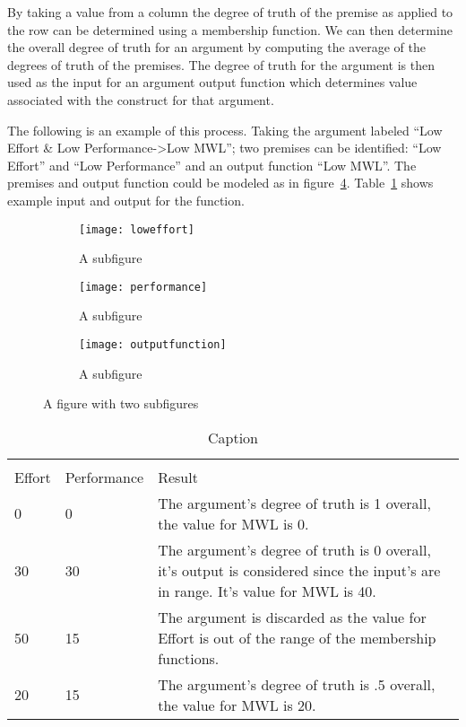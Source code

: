By taking a value from a column the degree of truth of the premise as applied to the row can be determined using a membership function. We can then determine the overall degree of truth for an argument by computing the average of the degrees of truth of the premises. The degree of truth for the argument is then used as the input for an argument output function which determines value associated with the construct for that argument.

The following is an example of this process. Taking the argument labeled ``Low Effort \& Low Performance->Low MWL''; two premises can be identified: ``Low Effort'' and ``Low Performance'' and an output function ``Low MWL''. The premises and output function could be modeled as in figure~\ref{fig:membership_functions}. Table~\ref{tab:memfunc_ex} shows example input and output for the function. 

\begin{figure}
\centering
\begin{subfigure}{.3\textwidth}
  \centering
  \texttt{[image: loweffort]}
  \caption{A subfigure}
  \label{fig:sub1}
\end{subfigure}%
\begin{subfigure}{.3\textwidth}
  \centering
  \texttt{[image: performance]}
  \caption{A subfigure}
  \label{fig:sub2}
\end{subfigure}
\begin{subfigure}{.3\textwidth}
  \centering
  \texttt{[image: outputfunction]}
  \caption{A subfigure}
  \label{fig:sub3}
\end{subfigure}
\caption{A figure with two subfigures}
\label{fig:membership_functions}
\end{figure}

\begin{table}[]
\begin{center}
  \begin{tabular}{ | l | l | p{8cm} |}
    \hline \\
Effort & Performance & Result \\
0 & 0 & The argument's degree of truth is 1 overall, the value for MWL is 0. \\
30 & 30 & The argument's degree of truth is 0 overall, it's output is considered since the input's are in range. It's value for MWL is 40. \\
50 & 15 & The argument is discarded as the value for Effort is out of the range of the membership functions. \\
20 & 15 & The argument's degree of truth is .5 overall, the value for MWL is 20. \\
    \hline
  \end{tabular}
\end{center}
\caption{Caption}
\label{tab:memfunc_ex}
\end{table}


